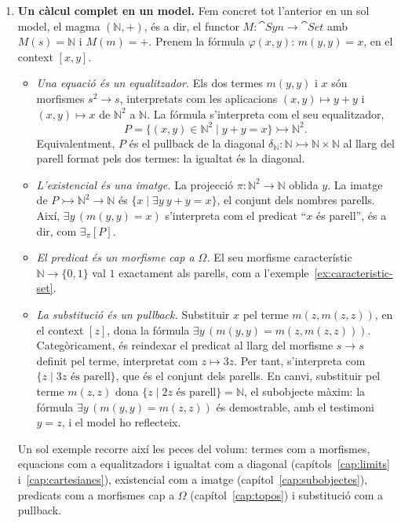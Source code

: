 \begin{enumerate}
  La substitució al llarg d'un morfisme de contextos s'interpreta per \textbf{reindexació}, és a dir, per pullback. En particular, si $\pi\colon s^{n+1}\to s^n$ és la projecció que oblida la darrera variable, $\pi^{*}$ és el debilitament, que considera un predicat sobre $s^n$ en el context ampliat. Si $P\rightarrowtail s^{n+1}$ representa $\varphi(\bar x,y)$, la \textbf{imatge} del compost
  \[
  P\rightarrowtail s^{n+1}\xrightarrow{\ \pi\ }s^n
  \]
  representa $\exists y\,\varphi(\bar x,y)$. Així, l'existencial és la imatge d'un predicat al llarg d'una projecció o, equivalentment, l'adjunt per l'esquerra de la reindexació (capítol~\ref{cap:subobjectes}).
  \item \textbf{Un càlcul complet en un model.} Fem concret tot l'anterior en un sol model, el magma $(\mathbb N,+)$, és a dir, el functor $M\colon\cat{Syn}\to\cat{Set}$ amb $M(s)=\mathbb N$ i $M(m)=+$. Prenem la fórmula $\varphi(x,y)$: $m(y,y)=x$, en el context $[x,y]$.
  \begin{itemize}
    \item \emph{Una equació és un equalitzador.} Els dos termes $m(y,y)$ i $x$ són morfismes $s^2\to s$, interpretats com les aplicacions $(x,y)\mapsto y+y$ i $(x,y)\mapsto x$ de $\mathbb N^2$ a $\mathbb N$. La fórmula s'interpreta com el seu equalitzador,
    \[
    P=\{(x,y)\in\mathbb N^2\mid y+y=x\}\rightarrowtail\mathbb N^2.
    \]
    Equivalentment, $P$ és el pullback de la diagonal $\delta_{\mathbb N}\colon\mathbb N\rightarrowtail\mathbb N\times\mathbb N$ al llarg del parell format pels dos termes: la igualtat és la diagonal.
    \item \emph{L'existencial és una imatge.} La projecció $\pi\colon\mathbb N^2\to\mathbb N$ oblida $y$. La imatge de $P\rightarrowtail\mathbb N^2\to\mathbb N$ és $\{x\mid\exists y\ y+y=x\}$, el conjunt dels nombres parells. Així, $\exists y\,(m(y,y)=x)$ s'interpreta com el predicat \enquote{$x$ és parell}, és a dir, com $\exists_\pi[P]$.
    \item \emph{El predicat és un morfisme cap a $\Omega$.} El seu morfisme característic $\mathbb N\to\{0,1\}$ val $1$ exactament als parells, com a l'exemple~\ref{ex:caracteristic-set}.
    \item \emph{La substitució és un pullback.} Substituir $x$ pel terme $m(z,m(z,z))$, en el context $[z]$, dona la fórmula $\exists y\,(m(y,y)=m(z,m(z,z)))$. Categòricament, és reindexar el predicat al llarg del morfisme $s\to s$ definit pel terme, interpretat com $z\mapsto 3z$. Per tant, s'interpreta com $\{z\mid 3z\text{ és parell}\}$, que és el conjunt dels parells. En canvi, substituir pel terme $m(z,z)$ dona $\{z\mid 2z\text{ és parell}\}=\mathbb N$, el subobjecte màxim: la fórmula $\exists y\,(m(y,y)=m(z,z))$ és demostrable, amb el testimoni $y=z$, i el model ho reflecteix.
  \end{itemize}
  Un sol exemple recorre així les peces del volum: termes com a morfismes, equacions com a equalitzadors i igualtat com a diagonal (capítols~\ref{cap:limits} i~\ref{cap:cartesianes}), existencial com a imatge (capítol~\ref{cap:subobjectes}), predicats com a morfismes cap a $\Omega$ (capítol~\ref{cap:topos}) i substitució com a pullback.
\end{enumerate}

